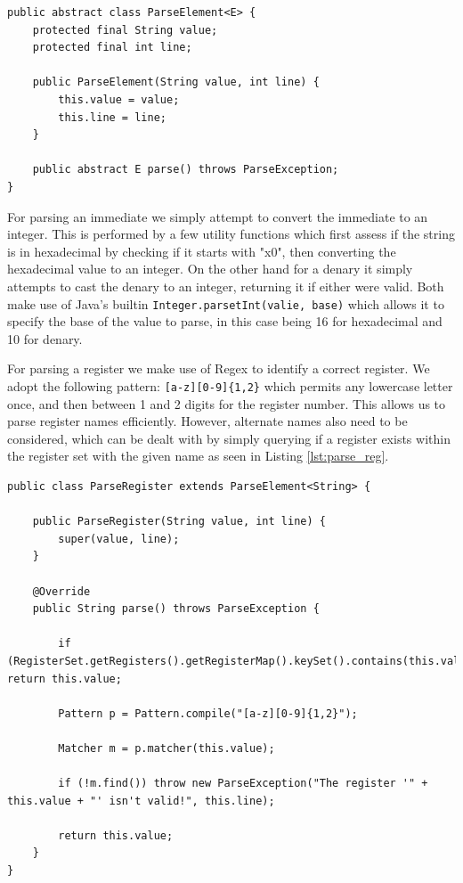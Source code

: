 \begin{lstlisting}[caption=ParseElement generic abstract class, label=lst:parse_element]
public abstract class ParseElement<E> {
    protected final String value;
    protected final int line;

    public ParseElement(String value, int line) {
        this.value = value;
        this.line = line;
    }

    public abstract E parse() throws ParseException;
}
\end{lstlisting}

For parsing an immediate we simply attempt to convert the immediate to an integer. This is performed by a few utility functions which first assess if the string is in hexadecimal by checking if it starts with "x0", then converting the hexadecimal value to an integer. On the other hand for a denary it simply attempts to cast the denary to an integer, returning it if either were valid. Both make use of Java's builtin \verb|Integer.parsetInt(valie, base)| which allows it to specify the base of the value to parse, in this case being 16 for hexadecimal and 10 for denary.

For parsing a register we make use of Regex to identify a correct register. We adopt the following pattern: \verb|[a-z][0-9]{1,2}| which permits any lowercase letter once, and then between 1 and 2 digits for the register number. This allows us to parse register names efficiently. However, alternate names also need to be considered, which can be dealt with by simply querying if a register exists within the register set with the given name as seen in Listing \ref{lst:parse_reg}.

\begin{lstlisting}[caption=Register Parsing class, label=lst:parse_reg]
public class ParseRegister extends ParseElement<String> {

    public ParseRegister(String value, int line) {
        super(value, line);
    }

    @Override
    public String parse() throws ParseException {

        if (RegisterSet.getRegisters().getRegisterMap().keySet().contains(this.value)) return this.value;

        Pattern p = Pattern.compile("[a-z][0-9]{1,2}");

        Matcher m = p.matcher(this.value);

        if (!m.find()) throw new ParseException("The register '" + this.value + "' isn't valid!", this.line);

        return this.value;
    }
}
\end{lstlisting}

